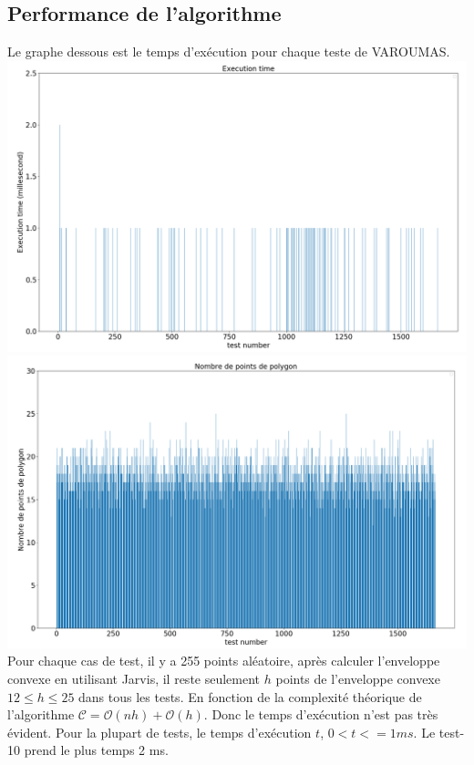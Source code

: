 \documentclass[14px]{article}
\begin{document}
\subsection{Performance de l'algorithme}
Le graphe dessous est le temps d'exécution pour chaque teste de VAROUMAS.\\
{
	\centering
\includegraphics[height=0.5\textwidth]{testTime_Rectangle.png}\\
\includegraphics[height=0.5\textwidth]{testNombre.png}\\
}
Pour chaque cas de test, il y a 255 points aléatoire, après calculer l'enveloppe convexe en utilisant Jarvis, il reste seulement $\mathit{h}$ points de l'enveloppe convexe $ 12 \leqslant h \leqslant 25 $ dans tous les tests. En fonction de la complexité théorique de l'algorithme  $\mathcal{C} = \mathcal{O}(nh) + \mathcal{O}(h)$.
Donc le temps d'exécution n'est pas très évident. Pour la plupart de tests, le temps d'exécution $\mathit{t}$, $ 0 < \mathit{t} <= 1 ms$. Le test-10 prend le plus temps 2 ms.
\end{document}
